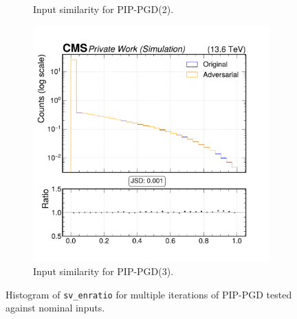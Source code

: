 \begin{figure}[htbp]
\begin{subfigure}[t]{0.32\textwidth}
    \caption*{Input similarity for PIP-PGD(2).}
  \end{subfigure}\hfill
  \begin{subfigure}[t]{0.32\textwidth}
    \includegraphics[width=\linewidth]{media/output/features/compare/combined_it_3/cmp_vtx_arr_sv_enratio.pdf}
    \caption*{Input similarity for PIP-PGD(3).}
  \end{subfigure}

  \caption*{Histogram of \texttt{sv\_enratio} for multiple iterations of PIP-PGD tested against nominal inputs.}
  \label{fig:combined_input_sv_enratio}
\end{figure}

